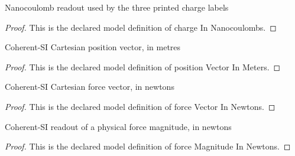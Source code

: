 \begin{definition}
  \label{def:physics:phyx-mini-0895:phyxminiproblems-problemphyxmini0895-chargeinnanocoulombs}
  Nanocoulomb readout used by the three printed charge labels
\end{definition}
\begin{proof}
  This is the declared model definition of charge In Nanocoulombs.
\end{proof}
\begin{definition}
  \label{def:physics:phyx-mini-0895:phyxminiproblems-problemphyxmini0895-positionvectorinmeters}
  Coherent-SI Cartesian position vector, in metres
\end{definition}
\begin{proof}
  This is the declared model definition of position Vector In Meters.
\end{proof}
\begin{definition}
  \label{def:physics:phyx-mini-0895:phyxminiproblems-problemphyxmini0895-forcevectorinnewtons}
  Coherent-SI Cartesian force vector, in newtons
\end{definition}
\begin{proof}
  This is the declared model definition of force Vector In Newtons.
\end{proof}
\begin{definition}
  \label{def:physics:phyx-mini-0895:phyxminiproblems-problemphyxmini0895-forcemagnitudeinnewtons}
  Coherent-SI readout of a physical force magnitude, in newtons
\end{definition}
\begin{proof}
  This is the declared model definition of force Magnitude In Newtons.
\end{proof}

